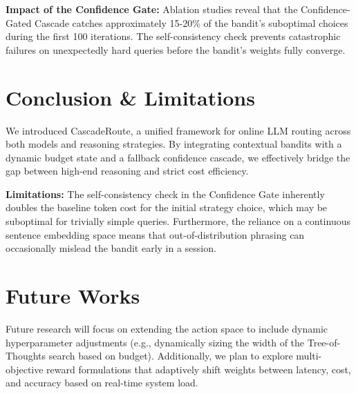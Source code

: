 \documentclass{article} %
\begin{document}
\textbf{Impact of the Confidence Gate:} Ablation studies reveal that the Confidence-Gated Cascade catches approximately 15-20\% of the bandit's suboptimal choices during the first 100 iterations. The self-consistency check prevents catastrophic failures on unexpectedly hard queries before the bandit's weights fully converge.

\section{Conclusion \& Limitations}

We introduced CascadeRoute, a unified framework for online LLM routing across both models and reasoning strategies. By integrating contextual bandits with a dynamic budget state and a fallback confidence cascade, we effectively bridge the gap between high-end reasoning and strict cost efficiency. 

\textbf{Limitations:} The self-consistency check in the Confidence Gate inherently doubles the baseline token cost for the initial strategy choice, which may be suboptimal for trivially simple queries. Furthermore, the reliance on a continuous sentence embedding space means that out-of-distribution phrasing can occasionally mislead the bandit early in a session.

\section{Future Works}

Future research will focus on extending the action space to include dynamic hyperparameter adjustments (e.g., dynamically sizing the width of the Tree-of-Thoughts search based on budget). Additionally, we plan to explore multi-objective reward formulations that adaptively shift weights between latency, cost, and accuracy based on real-time system load.



\end{document}

